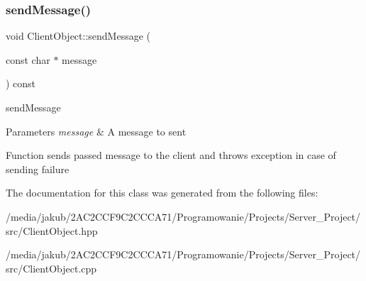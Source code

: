 \subsubsection{\texorpdfstring{send\+Message()}{sendMessage()}}
{\footnotesize\ttfamily void Client\+Object\+::send\+Message (\begin{DoxyParamCaption}\item[{const char $\ast$}]{message }\end{DoxyParamCaption}) const}



send\+Message 


\begin{DoxyParams}{Parameters}
{\em message} & A message to sent\\
\hline
\end{DoxyParams}
Function sends passed message to the client and throws exception in case of sending failure 

The documentation for this class was generated from the following files\+:\begin{DoxyCompactItemize}
\item 
/media/jakub/2\+A\+C2\+C\+C\+F9\+C2\+C\+C\+C\+A71/\+Programowanie/\+Projects/\+Server\+\_\+\+Project/src/Client\+Object.\+hpp\item 
/media/jakub/2\+A\+C2\+C\+C\+F9\+C2\+C\+C\+C\+A71/\+Programowanie/\+Projects/\+Server\+\_\+\+Project/src/Client\+Object.\+cpp\end{DoxyCompactItemize}
